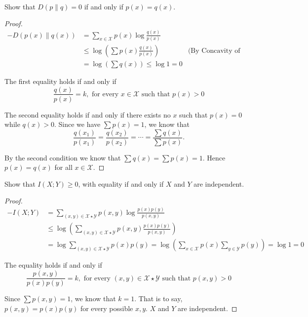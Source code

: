 \begin{exercise} {Show that $D(p \| q)=0$ if and only if $p(x)=q(x)$.}
\begin{proof}
\begin{equation}
  \begin{aligned}
    - D(p(x)\| q(x)) &= \sum_{x\in \mathcal{X}} p(x) \log \frac{q(x)}{p(x)} & \\
    &\le \log(\sum p(x) \frac{q(x)}{p(x)}) & \text{(By Concavity of log(x))} \\
    &= \log(\sum q(x)) \le \log 1 = 0  &
  \end{aligned}
\end{equation}

The first equality holds if and only if $$\frac{q(x)}{p(x)}=k, \text{ for every } x \in \mathcal{X} \text{ such that } p(x)>0 $$

The second equality holds if and only if there exists no $x$ such that $p(x)=0$ while $q(x)>0$. 
Since we have $\sum p(x) = 1$, we know that $$\frac{q(x_1)}{p(x_1)} = \frac{q(x_2)}{p(x_2)} = \cdots = \frac{\sum{q(x)}}{\sum p(x)}. $$

By the second condition we know that $\sum q(x) = \sum p(x) = 1$. Hence $p(x) = q(x)$ for all $x\in \mathcal{X}$.

\end{proof}
\label{ex1}
\end{exercise}


\begin{exercise} {Show that $I(X;Y) \ge 0$, with equality if and only if $X$ and $Y$ are independent.}
\begin{proof}
\begin{equation}
  \begin{aligned}
    -I(X;Y) &= \sum_{(x,y)\in \mathcal{X}\star \mathcal{Y}} p(x,y) \log {\frac{p(x)p(y)}{p(x,y)}} \\
    &\le \log \left( \sum_{(x,y)\in \mathcal{X} \star \mathcal{Y}} p(x,y) \frac{p(x)p(y)}{p(x,y)}\right) \\
    &=  \log{ \sum_{(x,y)\in \mathcal{X} \star \mathcal{Y} } {p(x)p(y)}} = \log \left(\sum_{x\in \mathcal{X}}p(x) \sum_{y \in \mathcal{Y}} p(y) \right) = \log 1 = 0
  \end{aligned}
\end{equation}

The equality holds if and only if $$\frac{p(x,y)}{p(x)p(y)}=k, \text{ for every } (x,y) \in \mathcal{X} \star \mathcal{Y} \text{ such that } p(x,y)>0$$

Since $\sum p(x,y) = 1$, we know that $k=1$. That is to say, $p(x,y) = p(x)p(y)$ for every possible $x,y$. $X$ and $Y$ are independent.

\end{proof}
\label{ex2}
\end{exercise}


